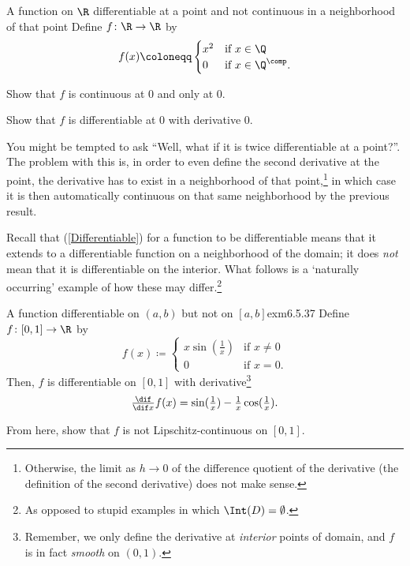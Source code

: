 \begin{exm}{A function on $\R$ differentiable at a point and not continuous in a neighborhood of that point}{}
Define $f\colon \R \rightarrow \R$ by
\begin{equation}
f(x)\coloneqq \begin{cases}x^2 & \text{if }x\in \Q \\ 0 & \text{if }x\in \Q ^{\comp}.\end{cases}
\end{equation}
\begin{exr}[breakable=false]{}{}
Show that $f$ is continuous at $0$ and only at $0$.
\end{exr}
\begin{exr}[breakable=false]{}{}
Show that $f$ is differentiable at $0$ with derivative $0$.
\end{exr}
\begin{rmk}
You might be tempted to ask ``Well, what if it is twice differentiable at a point?''.  The problem with this is, in order to even define the second derivative at the point, the derivative has to exist in a neighborhood of that point,\footnote{Otherwise, the limit as $h\to 0$ of the difference quotient of the derivative (the definition of the second derivative) does not make sense.} in which case it is then automatically continuous on that same neighborhood by the previous result.
\end{rmk}
\end{exm}

Recall that (\cref{Differentiable}) for a function to be differentiable means that it extends to a differentiable function on a neighborhood of the domain; it does \emph{not} mean that it is differentiable on the interior.  What follows is a `naturally occurring' example of how these may differ.\footnote{As opposed to stupid examples in which $\Int (D)=\emptyset$.}
\begin{exm}{A function differentiable on $(a,b)$ but not on $[a,b]$}{exm6.5.37}
Define $f\colon [0,1]\rightarrow \R$ by
\begin{equation}
f(x)\coloneqq \begin{cases}x\sin (\tfrac{1}{x}) & \text{if }x\neq 0 \\ 0 & \text{if }x=0.\end{cases}
\end{equation}
Then, $f$ is differentiable on $[0,1]$ with derivative\footnote{Remember, we only define the derivative at \emph{interior} points of domain, and $f$ is in fact \emph{smooth} on $(0,1)$.}
\begin{equation}
\tfrac{\dif}{\dif x}f(x)=\sin (\tfrac{1}{x})-\tfrac{1}{x}\cos (\tfrac{1}{x}).
\end{equation}
\begin{exr}[breakable=false]{}{}
From here, show that $f$ is not Lipschitz-continuous on $[0,1]$.
\end{exr}
\end{exm}

